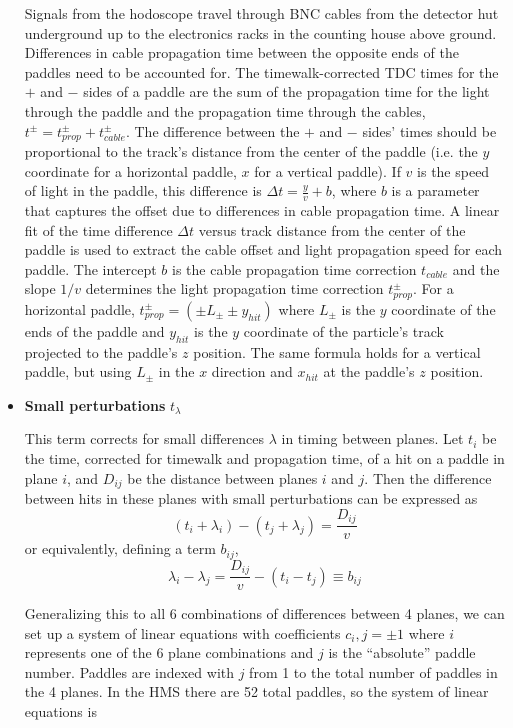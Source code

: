 \begin{itemize}
Signals from the hodoscope travel through BNC cables from the detector hut
underground up to the electronics racks in the counting house above ground.
Differences in cable propagation time between the opposite ends of the paddles
need to be accounted for.
The timewalk-corrected TDC times for the $+$ and $-$ sides of a paddle are
the sum of the propagation time for the light through the paddle
and the propagation time through the cables,
$t^{\pm}=t^{\pm}_{prop}+t^{\pm}_{cable}$.
The difference between the $+$ and $-$ sides' times should be proportional to
the track's distance from the center of the paddle
(i.e. the $y$ coordinate for a horizontal paddle, $x$ for a vertical paddle).
If $v$ is the speed of light in the paddle, this difference is
$\Delta t = \frac{y}{v} + b$,
where $b$ is a parameter that captures the offset due to differences in cable
propagation time.
A linear fit of the time difference $\Delta t$ versus track distance from the
center of the paddle is used to extract the cable offset and light propagation
speed for each paddle.
The intercept $b$ is the cable propagation time correction $t_{cable}$
and the slope $1/v$ determines the light propagation time correction
$t^\pm_{prop}$.
For a horizontal paddle,
$t^\pm_{prop} = (\pm L_\pm \pm y_{hit})$
where $L_\pm$ is the $y$ coordinate of the ends of the paddle and
$y_{hit}$ is the $y$ coordinate of the particle's track projected to the
paddle's $z$ position.
The same formula holds for a vertical paddle, but using $L_\pm$ in the $x$
direction and $x_{hit}$ at the paddle's $z$ position.

    \item \textbf{Small perturbations} $t_{\lambda}$

This term corrects for small differences $\lambda$ in timing between planes.
Let $t_i$ be the time, corrected for timewalk and propagation time,
of a hit on a paddle in plane $i$,
and $D_{ij}$ be the distance between planes $i$ and $j$.
Then the difference between hits in these planes with small perturbations can
be expressed as
\begin{equation}
    (t_i+\lambda_i) - (t_j+\lambda_j) = \frac{D_{ij}}{v}
\end{equation}
or equivalently, defining a term $b_{ij}$,
\begin{equation}
    \lambda_i - \lambda_j = \frac{D_{ij}}{v} - (t_i - t_j) \equiv b_{ij}
\end{equation}

Generalizing this to all 6 combinations of differences between 4 planes, we can
set up a system of linear equations with coefficients $c_i,j=\pm1$ where $i$
represents one of the 6 plane combinations and $j$ is the ``absolute'' paddle
number.
Paddles are indexed with $j$ from 1 to the total number of paddles in the
4 planes.
In the HMS there are 52 total paddles, so the system of linear equations is


\end{itemize}
